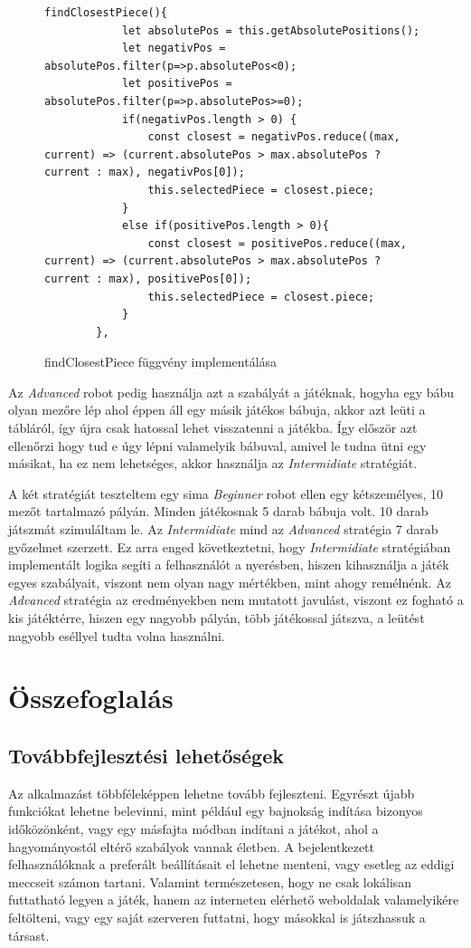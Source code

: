 \documentclass[a4paper,twoside]{article}
\begin{document}
\begin{figure}
	\caption{findClosestPiece függvény implementálása}
	\begin{minipage}{\textwidth}
		\begin{lstlisting}[style=javascriptStyle]
		findClosestPiece(){
			let absolutePos = this.getAbsolutePositions();
			let negativPos = absolutePos.filter(p=>p.absolutePos<0);
			let positivePos = absolutePos.filter(p=>p.absolutePos>=0);
			if(negativPos.length > 0) {
				const closest = negativPos.reduce((max, current) => (current.absolutePos > max.absolutePos ? current : max), negativPos[0]);
				this.selectedPiece = closest.piece;
			}
			else if(positivePos.length > 0){
				const closest = positivePos.reduce((max, current) => (current.absolutePos > max.absolutePos ? current : max), positivePos[0]);
				this.selectedPiece = closest.piece;
			}
		},
		\end{lstlisting}
	\end{minipage}
	
	\label{findClos}
\end{figure}
\FloatBarrier
 Az \textit{Advanced} robot pedig használja azt a szabályát a játéknak, hogyha egy bábu olyan mezőre lép ahol éppen áll egy másik játékos bábuja, akkor azt leüti a tábláról, így újra csak hatossal lehet visszatenni a játékba. Így először azt ellenőrzi hogy tud e úgy lépni valamelyik bábuval, amivel le tudna ütni egy másikat, ha ez nem lehetséges, akkor használja az \textit{Intermidiate} stratégiát.
 
A két stratégiát teszteltem egy sima \textit{Beginner} robot ellen egy kétszemélyes, 10 mezőt tartalmazó pályán. Minden játékosnak 5 darab bábuja volt. 10 darab játszmát szimuláltam le. Az \textit{Intermidiate} mind az \textit{Advanced} stratégia 7 darab győzelmet szerzett. Ez arra enged következtetni, hogy \textit{Intermidiate} stratégiában implementált logika segíti a felhasználót a nyerésben, hiszen kihasználja a játék egyes szabályait, viszont nem olyan nagy mértékben, mint ahogy remélnénk. Az \textit{Advanced} stratégia az eredményekben nem mutatott javulást, viszont ez fogható a kis játéktérre, hiszen egy nagyobb pályán, több játékossal játszva, a leütést nagyobb eséllyel tudta volna használni. 
\section{Összefoglalás}
\subsection{Továbbfejlesztési lehetőségek}
Az alkalmazást többféleképpen lehetne tovább fejleszteni. Egyrészt újabb funkciókat lehetne belevinni, mint például egy bajnokság indítása bizonyos időközönként, vagy egy másfajta módban indítani a játékot, ahol a hagyományostól eltérő szabályok vannak életben. A bejelentkezett felhasználóknak a preferált beállításait el lehetne menteni, vagy esetleg az eddigi meccseit számon tartani. Valamint természetesen, hogy ne csak lokálisan futtatható legyen a játék, hanem az interneten elérhető weboldalak valamelyikére feltölteni, vagy egy saját szerveren futtatni, hogy másokkal is játszhassuk a társast. 
\end{document}

